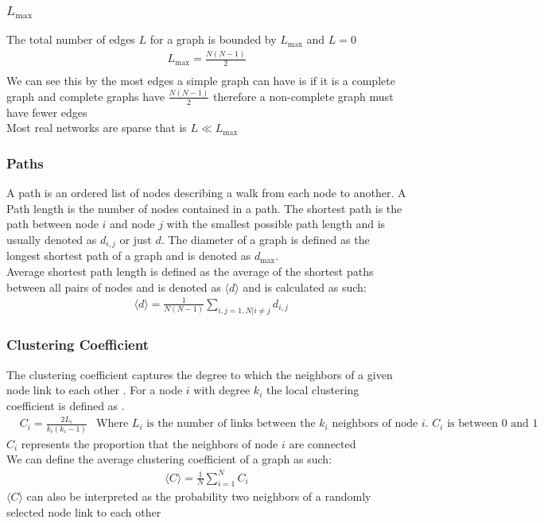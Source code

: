 \documentclass{article}
\begin{document}
        \subsubsection{$L_{\text{max}}$}
            The total number of edges $L$ for a graph is bounded by $L_{\text{max}}$ and $L=0$
            \begin{align*}
                L_{\text{max}} =  \frac{N(N-1)}{2}\\
            \end{align*}
            We can see this by the most edges a simple graph can have is if it is a complete graph and complete graphs have $\frac{N(N-1)}{2}$ therefore a non-complete graph must have fewer edges\\
            Most real networks are sparse that is $L\ll L_{\text{max}}$\\
        \subsubsection{Paths}
        A path is an ordered list of nodes describing a walk from each node to another. A Path length is the number of nodes contained in a path. The shortest path is the path between node $i$ and node $j$ with the smallest possible path length and is usually denoted as $d_{i,j}$ or just $d$. The diameter of a graph is defined as the longest shortest path of a graph and is denoted as $d_{\text{max}}$.\\
        Average shortest path length is defined as the average of the shortest paths between all pairs of nodes and is denoted as $\langle d \rangle$ and is calculated as such:
        \begin{align*}
            &\langle d \rangle = \frac{1}{N(N-1)}\sum_{i,j=1,N | i\neq j}d_{i,j}
        \end{align*}

        \subsubsection{Clustering Coefficient}
            The clustering coefficient captures the degree to which the neighbors of a given node link to each other \parencite{barabasi2013network}. For a node $i$ with degree $k_{i}$ the local clustering coefficient is defined as \parencite{Watts1998}.
            \begin{align*}
                &C_{i} = \frac{2L_{i}}{k_{i}(k_{i}-1)} 
                &\text{Where $L_{i}$ is the number of links between the $k_i$ neighbors of node $i$. $C_{i}$ is between $0$ and $1$}
            \end{align*}
            $C_i$ represents the proportion that the neighbors of node $i$ are connected\\
            We can define the average clustering coefficient of a graph as such:
            \begin{align*}
                \langle C \rangle = \frac{1}{N}\sum_{i=1}^{N}C_{i}
            \end{align*}
            $\langle C \rangle$ can also be interpreted as the probability two neighbors of a randomly selected node link to each other
\end{document}
